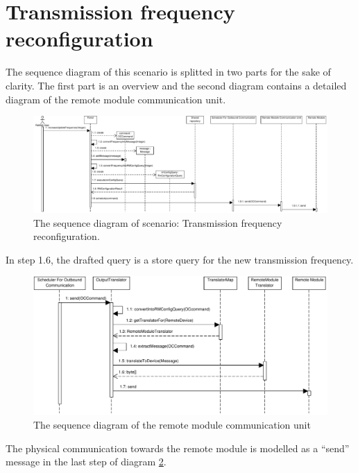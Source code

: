 \section{Transmission frequency reconfiguration}

\npar The sequence diagram of this scenario is splitted in two parts for the
sake of clarity. The first part is an overview and the second diagram
contains a detailed diagram of the remote module communication unit.

\begin{figure}[H]
	\begin{centering}
		\includegraphics[width=1.4\textwidth,angle=90]{figs/scenario-5-3-2.pdf}
		\caption{The sequence diagram of scenario: Transmission frequency reconfiguration.}
		\label{fig:scenario-5-3-2}
	\end{centering}
\end{figure}

\npar In step 1.6, the drafted query is a store query for the new transmission
frequency. 

\begin{figure}[H]
	\begin{centering}
		\includegraphics[width=\textwidth]{figs/scenario-5-3-2a.pdf}
		\caption{The sequence diagram of the remote module communication unit}
		\label{fig:scenario-5-3-2a}
	\end{centering}
\end{figure}

\npar The physical communication towards the remote module is modelled as a
``send'' message in the last step of diagram \ref{fig:scenario-5-3-2a}.
